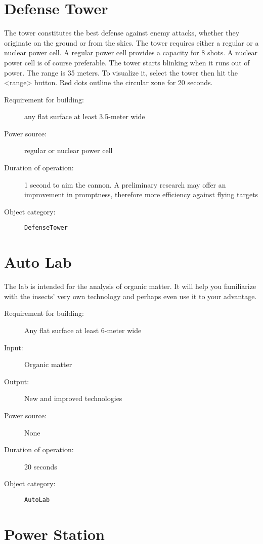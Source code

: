 \section{Defense Tower}

The tower constitutes the best defense against enemy attacks, whether they originate on the ground or from the skies. The tower requires either a regular or a nuclear power cell. A regular power cell provides a capacity for 8 shots. A nuclear power cell is of course preferable. The tower starts blinking when it runs out of power. The range is 35 meters. To visualize it, select the tower then hit the <range> button. Red dots outline the circular zone for 20 seconds.

\begin{description}
    \item[Requirement for building:] any flat surface at least 3.5-meter wide
    \item[Power source:] regular or nuclear power cell
    \item[Duration of operation:] 1 second to aim the cannon. A preliminary research may offer an improvement in promptness, therefore more efficiency against flying targets
    \item[Object category:] \texttt{DefenseTower}
\end{description}


\section{Auto Lab}

The lab is intended for the analysis of organic matter. It will help you familiarize with the insects' very own technology and perhaps even use it to your advantage.

\begin{description}
    \item[Requirement for building:] Any flat surface at least 6-meter wide
    \item[Input:] Organic matter
    \item[Output:] New and improved technologies
    \item[Power source:] None
    \item[Duration of operation:] 20 seconds
    \item[Object category:] \texttt{AutoLab}
\end{description}


\section{Power Station}

